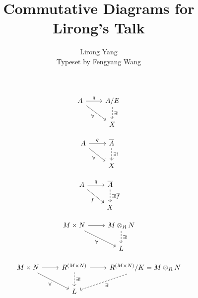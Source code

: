 \documentclass{article}
\title{Commutative Diagrams for Lirong's Talk}
\author{Lirong Yang\\Typeset by Fengyang Wang}
\begin{document}
\maketitle

\[
\begin{tikzcd}
  A \arrow[rd, "\forall" below left] \arrow[r, "q"] & A/E \arrow[d, "\exists!", dashed] \\
  & X
\end{tikzcd}
\]

\[
\begin{tikzcd}
  A \arrow[rd, "\forall" below left] \arrow[r, "q"] & \overline{A} \arrow[d, "\exists!", dashed] \\
  & X
\end{tikzcd}
\]


\[
\begin{tikzcd}
  A \arrow[rd, "f" below left] \arrow[r, "q"] &
  \overline{A} \arrow[d, "\exists!\\\overline{f}", dashed] \\
  & X
\end{tikzcd}
\]

\[
\begin{tikzcd}
  M\times N \arrow[r] \arrow[rd, "\forall" below left ] &
  M \otimes_R N \arrow[d, "\exists!", dashed]\\
  & L
\end{tikzcd}
\]

\[
\begin{tikzcd}
  M\times N \arrow[r] \arrow[rd, "\forall" below left] &
  R^{(M\times N)} \arrow[r] \arrow[d, "\exists!", dashed] &
  R^{(M\times N)}/K = M \otimes_R N \arrow[ld, "\exists!", dashed] \\
  & L &
\end{tikzcd}
\]
\end{document}
